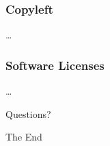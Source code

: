 \documentclass{beamer}
\begin{document}
\begin{frame}
\frametitle{Copyleft}

\ldots

\end{frame}



\begin{frame}
\frametitle{Software Licenses}

\ldots

\end{frame}


\begin{frame}
\Huge{\centerline{Questions?}}
\end{frame}


\begin{frame}
\Huge{\centerline{The End}}
\end{frame}

\end{document}
